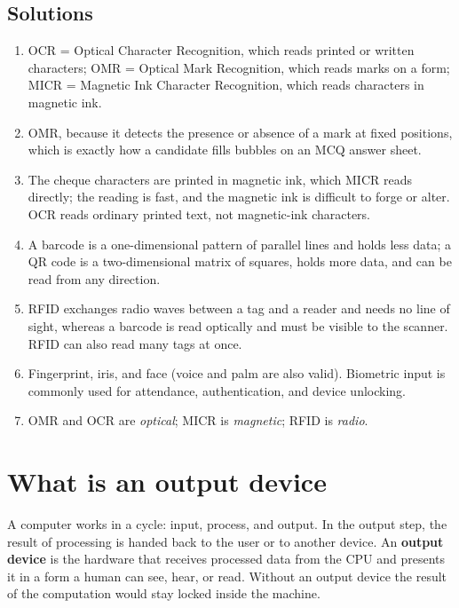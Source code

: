 \subsection*{Solutions}
\begingroup\small
\begin{enumerate}[label=\arabic*.]
  \item OCR = Optical Character Recognition, which reads printed or written
    characters; OMR = Optical Mark Recognition, which reads marks on a form;
    MICR = Magnetic Ink Character Recognition, which reads characters in
    magnetic ink.
  \item OMR, because it detects the presence or absence of a mark at fixed
    positions, which is exactly how a candidate fills bubbles on an MCQ
    answer sheet.
  \item The cheque characters are printed in magnetic ink, which MICR reads
    directly; the reading is fast, and the magnetic ink is difficult to
    forge or alter. OCR reads ordinary printed text, not magnetic-ink
    characters.
  \item A barcode is a one-dimensional pattern of parallel lines and holds
    less data; a QR code is a two-dimensional matrix of squares, holds more
    data, and can be read from any direction.
  \item RFID exchanges radio waves between a tag and a reader and needs no
    line of sight, whereas a barcode is read optically and must be visible
    to the scanner. RFID can also read many tags at once.
  \item Fingerprint, iris, and face (voice and palm are also valid).
    Biometric input is commonly used for attendance, authentication, and
    device unlocking.
  \item OMR and OCR are \emph{optical}; MICR is \emph{magnetic}; RFID is
    \emph{radio}.
\end{enumerate}
\endgroup

\section{What is an output device}
A computer works in a cycle: input, process, and output. In the output step,
the result of processing is handed back to the user or to another device. An
\textbf{output device} is the hardware that receives processed data from the
CPU and presents it in a form a human can see, hear, or read. Without an
output device the result of the computation would stay locked inside the
machine.

